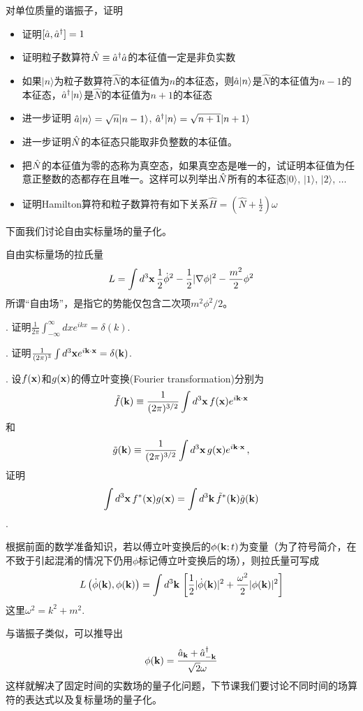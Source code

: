 \documentclass[CJK]{beamer}
\begin{document}
\begin{frame}
\bch
对单位质量的谐振子，证明
\begin{itemize}
\item{证明$[\hat{a}, {\hat{a}^\dagger}] = 1$}
\item{证明粒子数算符$\hat{N} \equiv {\hat{a}^\dagger} \hat{a}$的本征值一定是非负实数}
\item{如果$|n\rangle$为粒子数算符$\hat{N}$的本征值为$n$的本征态，则$\hat{a}|n\rangle$是$\hat{N}$的本征值为$n-1$的本征态，${\hat{a}^\dagger}|n\rangle$是$\hat{N}$的本征值为$n+1$的本征态}
\item{进一步证明 $\hat{a}|n\rangle = \sqrt{n}|n-1\rangle$, ${\hat{a}^\dagger}|n\rangle = \sqrt{n+1}|n+1\rangle$} 
\item{进一步证明$\hat{N}$的本征态只能取非负整数的本征值。}
\item{把$\hat{N}$的本征值为零的态称为真空态，如果真空态是唯一的，试证明本征值为任意正整数的态都存在且唯一。这样可以列举出$\hat{N}$所有的本征态$|0\rangle$, $|1\rangle$, $|2\rangle$, $\ldots$}
\item{证明Hamilton算符和粒子数算符有如下关系$\hat{H} = (\hat{N} + \frac{1}{2})\omega$}
\end{itemize}
\ech
\end{frame}

\begin{frame}
\bch
下面我们讨论自由实标量场的量子化。

\skipline
自由实标量场的拉氏量
$$L = \int d^3\mathbf{x} \, \frac{1}{2}\dot\phi^2 - \frac{1}{2}|\nabla \phi|^2 - \frac{m^2}{2}\phi^2$$
所谓“自由场”，是指它的势能仅包含二次项$m^2\phi^2/2$。

\ech
\end{frame}


\begin{frame}
. 证明$\frac{1}{2\pi}\int_{-\infty}^{\infty} dx e^{ikx} = \delta(k)$.

. 证明$\frac{1}{(2\pi)^3}\int d^3\mathbf{x} e^{i\mathbf{k}\cdot\mathbf{x}} = \delta(\mathbf{k})$.


. 设$f(\mathbf{x})$和$g(\mathbf{x})$的傅立叶变换(Fourier transformation)分别为
$$\tilde{f}(\mathbf{k}) \equiv \frac{1}{(2\pi)^{3/2}}\int d^3\mathbf{x}\, f(\mathbf{x})e^{i\mathbf{k}\cdot\mathbf{x}}$$和
$$\tilde{g}(\mathbf{k}) \equiv \frac{1}{(2\pi)^{3/2}}\int d^3\mathbf{x}\, g(\mathbf{x})e^{i\mathbf{k}\cdot\mathbf{x}}\,,$$
证明
$$\int d^3\mathbf{x}\,f^*(\mathbf{x})g(\mathbf{x}) = \int d^3\mathbf{k}\, \tilde{f}^*(\mathbf{k})\tilde{g}(\mathbf{k})$$.


\ech
\end{frame}

\begin{frame}
\bch
根据前面的数学准备知识，若以傅立叶变换后的$\phi(\mathbf{k};t)$为变量（为了符号简介，在不致于引起混淆的情况下仍用$\phi$标记傅立叶变换后的场），则拉氏量可写成
$$L\left(\dot\phi(\mathbf{k}), \phi(\mathbf{k})\right) = \int d^3\mathbf{k} \,\left[\frac{1}{2}|\dot\phi(\mathbf{k})|^2 + \frac{\omega^2}{2} |\phi(\mathbf{k})|^2\right]$$
这里$\omega^2 = k^2 + m^2$.

\skipline
与谐振子类似，可以推导出
$$\phi(\mathbf{k}) = \frac{\hat{a}_{\mathbf{k}}+{\hat{a}^\dagger}_{-\mathbf{k}}}{\sqrt{2}\omega}$$
这样就解决了固定时间的实数场的量子化问题，下节课我们要讨论不同时间的场算符的表达式以及复标量场的量子化。
\ech
\end{frame}
\end{document}
